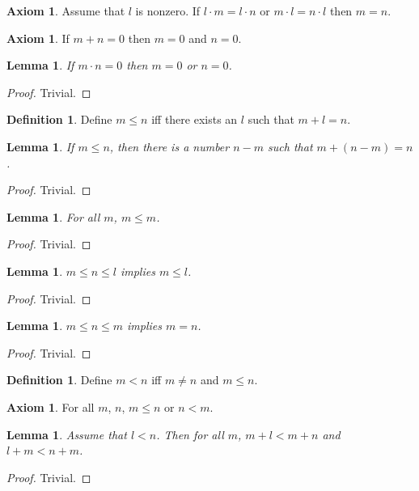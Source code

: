 \documentclass[a4paper,10pt]{article}
\theoremstyle{plain}
\newtheorem{lemma}[theorem]{Lemma}
\theoremstyle{definition}
\newtheorem{definition}[theorem]{Definition}
\newtheorem{axiom}[theorem]{Axiom}
\begin{document}
\begin{axiom} 
Assume that $l$ is nonzero. If $l \cdot m = l \cdot n$ or $m \cdot l = n \cdot l$ then $m = n$.
\end{axiom}

\begin{axiom} 
If $m + n = 0$ then $m = 0$ and $n = 0$.
\end{axiom}

\begin{lemma} 
If $m \cdot n = 0$ then $m = 0$ or $n = 0$.
\end{lemma}
\begin{proof}
Trivial.
\end{proof}

\begin{definition} 
Define $m \leq n$ iff there exists an $l$ such that $m + l = n$.
\end{definition}

\begin{lemma}
If $m \leq n$, then there is a number $n - m$ such that $m + (n-m) = n$.
\end{lemma}
\begin{proof}
Trivial.
\end{proof}

\begin{lemma} 
For all $m$, $m \leq m$.
\end{lemma}
\begin{proof}
Trivial.
\end{proof}

\begin{lemma} 
$m \leq n \leq l$ implies $m \leq l$.
\end{lemma}
\begin{proof}
Trivial.
\end{proof}

\begin{lemma} 
$m \leq n \leq m$ implies $m = n$. 
\end{lemma}
\begin{proof}
Trivial.
\end{proof}

\begin{definition}
Define $m < n$ iff $m \neq n$ and $m \leq n$.
\end{definition}

\begin{axiom}
For all $m$, $n$, $m \leq n$ or $n < m$. 
\end{axiom}

\begin{lemma} 
Assume that $l < n$.
Then for all $m$, $m + l < m + n$ and $l + m < n + m$.
\end{lemma}
\begin{proof}
Trivial.
\end{proof}
\end{document}
